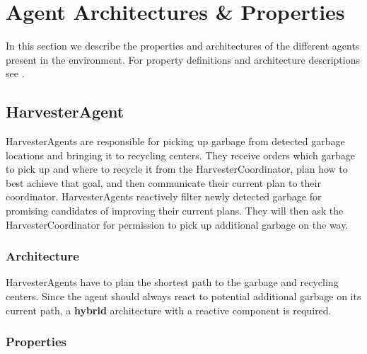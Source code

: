 \section{Agent Architectures \& Properties}

In this section we describe the properties and architectures of the different agents present in the environment. For property definitions and architecture descriptions see \cite{Woolridge2009}.

\subsection{HarvesterAgent}

HarvesterAgents are responsible for picking up garbage from detected garbage locations and bringing it to recycling centers. They receive orders which garbage to pick up and where to recycle it from the HarvesterCoordinator, plan how to best achieve that goal, and then communicate their current plan to their coordinator. HarvesterAgents reactively filter newly detected garbage for promising candidates of improving their current plans. They will then ask the HarvesterCoordinator for permission to pick up additional garbage on the way.

\subsubsection*{Architecture}

HarvesterAgents have to plan the shortest path to the garbage and recycling centers. Since the agent should always react to potential additional garbage on its current path, a \textbf{hybrid} architecture with a reactive component is required.

\subsubsection*{Properties}

